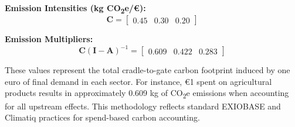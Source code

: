 \documentclass[12pt,a4paper]{article}%
\begin{document}
\textbf{Emission Intensities (kg CO\textsubscript{2}e/€):}
\[
\mathbf{C} = \begin{bmatrix} 0.45 & 0.30 & 0.20 \end{bmatrix}
\]

\textbf{Emission Multipliers:}
\[
\mathbf{C} (\mathbf{I} - \mathbf{A})^{-1} =
\begin{bmatrix}
0.609 & 0.422 & 0.283
\end{bmatrix}
\]

These values represent the total cradle-to-gate carbon footprint induced by one euro of final demand in each sector. For instance, €1 spent on agricultural products results in approximately 0.609 kg of CO\textsubscript{2}e emissions when accounting for all upstream effects. This methodology reflects standard EXIOBASE and Climatiq practices for spend-based carbon accounting.
\end{document}
